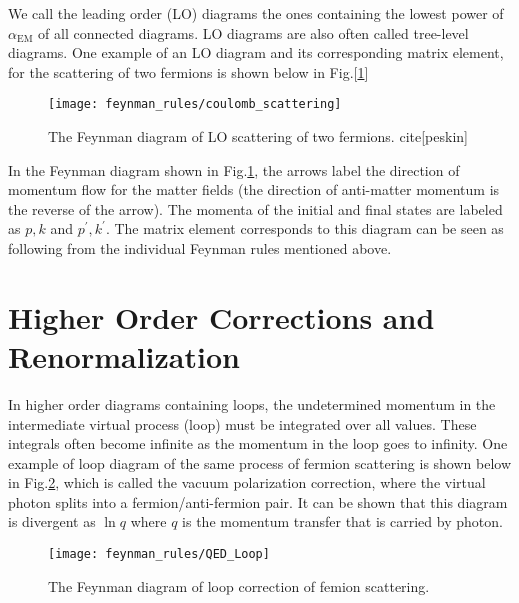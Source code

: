 We call the leading order (LO) diagrams the ones containing the lowest power of $\alpha_{\mathrm{EM}}$ of all connected diagrams. LO diagrams are also often called tree-level diagrams. One example of an LO diagram and its corresponding matrix element, for the scattering of two fermions is shown below in Fig.[\ref{fig:QED_scattering}]
	
 \begin{figure}[hbt]
	\begin{center}
		\texttt{[image: feynman\_rules/coulomb\_scattering]}
		\caption{\small The Feynman diagram of LO scattering of two fermions. cite[peskin]}
		\label{fig:QED_scattering}
	\end{center}
\end{figure}	
	
In the Feynman diagram shown in Fig.\ref{fig:QED_scattering}, the arrows label the direction of momentum flow for the matter fields (the direction of anti-matter momentum is the reverse of the arrow). The momenta of the initial and final states are labeled as $p,k$ and $p^\prime,k^\prime$. The matrix element corresponds to this diagram can be seen as following from the individual Feynman rules mentioned above.

\section{Higher Order Corrections and Renormalization}

In higher order diagrams containing loops, the undetermined momentum in the intermediate virtual process (loop) must be integrated over all values. These integrals often become infinite as the momentum in the loop goes to infinity. One example of loop diagram of the same process of fermion scattering is shown below in Fig.\ref{fig:QED_loop}, which is called the vacuum polarization correction, where the virtual photon splits into a fermion/anti-fermion pair. It can be shown that this diagram is divergent as $\ln q$ where $q$ is the momentum transfer that is carried by photon. 

 \begin{figure}[hbt]
	\begin{center}
		\texttt{[image: feynman\_rules/QED\_Loop]}
		\caption{\small The Feynman diagram of loop correction of femion scattering.}
		\label{fig:QED_loop}
	\end{center}
\end{figure}

